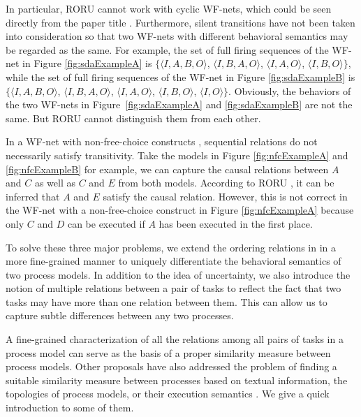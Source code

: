 \documentclass{llncs}
\begin{document}
In particular, RORU cannot work with cyclic WF-nets, which could be seen directly from the paper title \cite{jin2014computing}. Furthermore, silent transitions have not been taken into consideration so that two WF-nets with different behavioral semantics may be regarded as the same. For example, the set of full firing sequences of the WF-net in Figure \ref{fig:sdaExampleA} is $\{\langle I,A,B,O\rangle$, $\langle I,B,A,O\rangle$, $\langle I,A,O\rangle$, $\langle I,B,O\rangle\}$, while the set of full firing sequences of the WF-net in Figure \ref{fig:sdaExampleB} is $\{\langle I,A,B,O\rangle$, $\langle I,B,A,O\rangle$, $\langle I,A,O\rangle$, $\langle I,B,O\rangle$, $\langle I,O\rangle\}$. Obviously, the behaviors of the two WF-nets in Figure~\ref{fig:sdaExampleA} and \ref{fig:sdaExampleB} are not the same. But RORU cannot distinguish them from each other.

In a WF-net with non-free-choice constructs \cite{de2003workflow}, sequential relations do not necessarily satisfy transitivity. Take the models in Figure \ref{fig:nfcExampleA} and \ref{fig:nfcExampleB} for example, we can capture the causal relations between $A$ and $C$ as well as $C$ and $E$ from both models. According to RORU \cite{jin2014computing}, it can be inferred that $A$ and $E$ satisfy the causal relation. However, this is not correct in the WF-net with a non-free-choice construct in Figure \ref{fig:nfcExampleA} because only $C$ and $D$ can be executed if $A$ has been executed in the first place.

To solve these three major problems, we extend the ordering relations in \cite{jin2014computing} in a more fine-grained manner to uniquely differentiate the behavioral semantics of two process models. In addition to the idea of uncertainty, we also introduce the notion of multiple relations between a pair of tasks to reflect the fact that two tasks may have more than one relation between them.  This can allow us to capture subtle differences between any two processes.

A fine-grained characterization of all the relations among all pairs of tasks in a process model can serve as the basis of a proper similarity measure between process models. Other proposals have also addressed the problem of finding a suitable similarity measure between processes based on textual information, the topologies of process models, or their execution semantics \cite{weidlich2011efficient}. We give a quick introduction to some of them.
\end{document}
